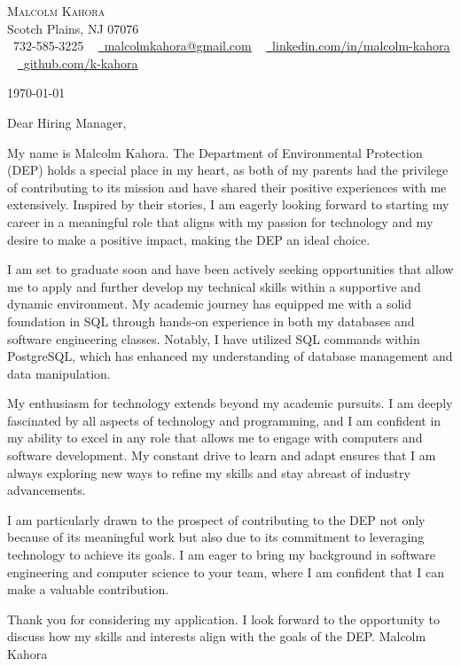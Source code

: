 \documentclass[letterpaper,11pt]{article}
\begin{document}
\begin{center}
    {\Huge \scshape Malcolm Kahora} \\ \vspace{1pt}
    Scotch Plains, NJ 07076 \\ \vspace{1pt}
    \small \raisebox{-0.1\height}\faPhone\ 732-585-3225 ~ \href{mailto:malcolmkahora@gmail.com}{\raisebox{-0.2\height}\faEnvelope\  \underline{malcolmkahora@gmail.com}} ~ 
    \href{https://linkedin.com/in/malcolm-kahora/}{\raisebox{-0.2\height}\faLinkedin\ \underline{linkedin.com/in/malcolm-kahora}}  ~
    \href{https://github.com/k-kahora}{\raisebox{-0.2\height}\faGithub\ \underline{github.com/k-kahora}}
    \vspace{-8pt}
\end{center}

\today

Dear Hiring Manager,

My name is Malcolm Kahora. The Department of Environmental Protection (DEP) holds a special place in my heart, as both of my parents had the privilege of contributing to its mission and have shared their positive experiences with me extensively. Inspired by their stories, I am eagerly looking forward to starting my career in a meaningful role that aligns with my passion for technology and my desire to make a positive impact, making the DEP an ideal choice.

I am set to graduate soon and have been actively seeking opportunities that allow me to apply and further develop my technical skills within a supportive and dynamic environment. My academic journey has equipped me with a solid foundation in SQL through hands-on experience in both my databases and software engineering classes. Notably, I have utilized SQL commands within PostgreSQL, which has enhanced my understanding of database management and data manipulation.

My enthusiasm for technology extends beyond my academic pursuits. I am deeply fascinated by all aspects of technology and programming, and I am confident in my ability to excel in any role that allows me to engage with computers and software development. My constant drive to learn and adapt ensures that I am always exploring new ways to refine my skills and stay abreast of industry advancements.

I am particularly drawn to the prospect of contributing to the DEP not only because of its meaningful work but also due to its commitment to leveraging technology to achieve its goals. I am eager to bring my background in software engineering and computer science to your team, where I am confident that I can make a valuable contribution.

Thank you for considering my application. I look forward to the opportunity to discuss how my skills and interests align with the goals of the DEP.
\vspace{50pt}
Malcolm Kahora
\end{document}
